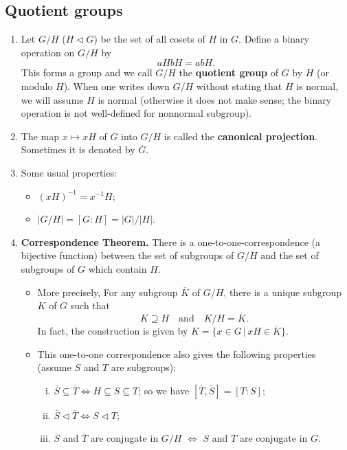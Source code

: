 \subsection*{Quotient groups}
\begin{enumerate}[(1)]
	\item Let $G/H$ ($H\lhd G$) be the set of all cosets of $H$ in $G$. Define a binary operation on $G/H$ by
	\begin{equation*}
		aHbH = abH.
	\end{equation*}
	This forms a group and we call $G/H$ the \textbf{quotient group} of $G$ by $H$ (or modulo $H$). When one writes down $G/H$ without stating that $H$ is normal, we will assume $H$ is normal (otherwise it does not make sense; the binary operation is not well-defined for nonnormal subgroup).
	\item The map $x\mapsto xH$ of $G$ into $G/H$ is called the \textbf{canonical projection}. Sometimes it is denoted by $\overline{G}$.
	\item Some usual properties:
	\begin{itemize}
		\item $(xH)^{-1} = x^{-1}H$;
		\item $|G/H| = [G:H] = |G|/|H|$.
	\end{itemize}
	
	\item \textbf{Correspondence Theorem.} There is a one-to-one-correspondence (a bijective function) between the set of subgroups of $G/H$ and the set of subgroups of $G$ which contain $H$. 
	\begin{itemize}
		\item More precisely, For any subgroup $\overline{K}$ of $G/H$, there is a unique subgroup $K$ of $G$ such that 
		\begin{equation*}
			K\supseteq H\quad \text{and}\quad K/H =\overline{K}.
		\end{equation*}
		In fact, the construction is given by $K = \{x\in G\,|\, xH\in \overline{K}\}$.
		\item This one-to-one correspondence also gives the following properties (assume $S$ and $T$ are subgroups):
		\begin{enumerate}[(i)]
			\item $\overline{S}\subseteq \overline{T} \Leftrightarrow H\subseteq S\subseteq T$; so we have $[\overline{T} ,\overline{S}] = [T:S]$;
			\item $\overline{S}\lhd \overline{T}\Leftrightarrow S\lhd T$;
			\item $\overline{S}$ and $\overline{T}$ are conjugate in $G/H$ $\Leftrightarrow$ $S$ and $T$ are conjugate in $G$.
		\end{enumerate}
	\end{itemize}
\end{enumerate}